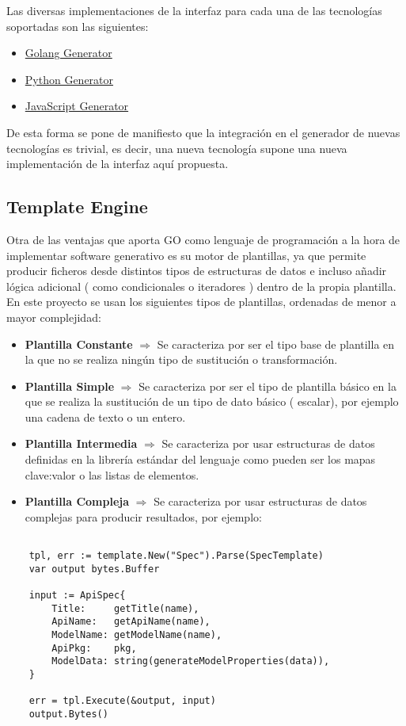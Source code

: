 \documentclass{svproc}
\begin{document}
Las diversas implementaciones de la interfaz  para cada una de las tecnologías soportadas son las siguientes: 

\begin{itemize}
\item \href{https://github.com/hugobarzano/apigena/blob/master/gen/internal/core/go.go}{Golang Generator} 
\item \href{https://github.com/hugobarzano/apigena/blob/master/gen/internal/core/python.go}{Python Generator} 
\item \href{https://github.com/hugobarzano/apigena/blob/master/gen/internal/core/js.go}{JavaScript Generator} 
\end{itemize}

De esta forma se pone de manifiesto que la integración en el generador de nuevas tecnologías es trivial, es decir, una nueva tecnología supone una nueva implementación de la interfaz aquí propuesta. 


\subsection{Template Engine}

Otra de las ventajas que aporta GO como lenguaje de programación a la hora de implementar software generativo es su motor de plantillas, ya que permite producir ficheros desde distintos tipos de estructuras de datos e incluso añadir lógica adicional ( como condicionales o iteradores ) dentro de la propia plantilla. 
En este proyecto se usan los siguientes tipos de plantillas, ordenadas de menor a mayor complejidad: 
\begin{itemize}
\item \textbf{Plantilla Constante}  $\Rightarrow$ Se caracteriza por ser el tipo base de plantilla en la que no se realiza ningún tipo de sustitución o transformación. 
\item \textbf{ Plantilla Simple}  $\Rightarrow$ Se caracteriza por ser el tipo de plantilla básico en la que se realiza la sustitución de un tipo de dato básico ( escalar), por ejemplo una cadena de texto o un entero. 
\item \textbf{ Plantilla Intermedia}  $\Rightarrow$ Se caracteriza por usar estructuras de datos definidas en la librería estándar del lenguaje  como pueden ser los mapas clave:valor o las listas de elementos. 
\item \textbf{Plantilla Compleja} $\Rightarrow$ Se caracteriza por usar estructuras de datos complejas para producir resultados, por ejemplo: 
\end{itemize}
\begin{lstlisting}

	tpl, err := template.New("Spec").Parse(SpecTemplate)
	var output bytes.Buffer
	
	input := ApiSpec{
		Title:     getTitle(name),
		ApiName:   getApiName(name),
		ModelName: getModelName(name),
		ApiPkg:    pkg,
		ModelData: string(generateModelProperties(data)),
	}

	err = tpl.Execute(&output, input)
	output.Bytes()
\end{lstlisting}
\end{document}
